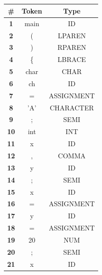 \documentclass{article}
\begin{document}
\subsection{}
\begin{latin}
\begin{longtable}[c]{|c|c|c|}
\hline
\textbf{\#} & \textbf{Token}            & \textbf{Type} \\ \hline
\textbf{1}  & main                      & ID            \\ \hline
\textbf{2}  & (                         & LPAREN        \\ \hline
\textbf{3}  & )                         & RPAREN        \\ \hline
\textbf{4}  & \{    & LBRACE        \\ \hline
\textbf{5}  & char                      & CHAR          \\ \hline
\textbf{6}  & ch                        & ID            \\ \hline
\textbf{7}  & =                         & ASSIGNMENT    \\ \hline
\textbf{8}  & 'A'                       & CHARACTER     \\ \hline
\textbf{9}  & ;                         & SEMI          \\ \hline
\textbf{10} & int                       & INT           \\ \hline
\textbf{11} & x                         & ID            \\ \hline
\textbf{12} & ,                         & COMMA         \\ \hline
\textbf{13} & y                         & ID            \\ \hline
\textbf{14} & ;                         & SEMI          \\ \hline
\textbf{15} & x                         & ID            \\ \hline
\textbf{16} & =                         & ASSIGNMENT    \\ \hline
\textbf{17} & y                         & ID            \\ \hline
\textbf{18} & =                         & ASSIGNMENT    \\ \hline
\textbf{19} & 20                        & NUM           \\ \hline
\textbf{20} & ;                         & SEMI          \\ \hline
\textbf{21} & x                         & ID            \\ \hline

\end{longtable}
\end{latin}
\end{document}
